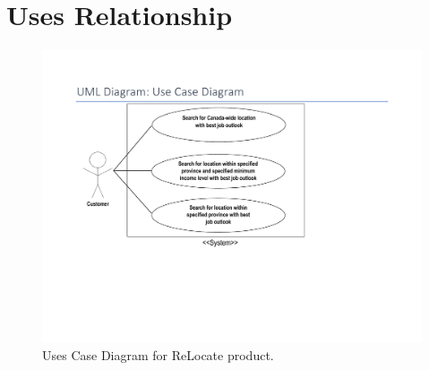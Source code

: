 \documentclass[12pt,fleqn]{article}
\begin{document}
\newpage
\section*{Uses Relationship}
\begin{figure}[h]
  \includegraphics[width=\linewidth] {Group04_Uses_Diagram.pdf}
  \caption{Uses Case Diagram for ReLocate product.}
  \label{fig:uses}
\end{figure}





\newpage
\end{document}
